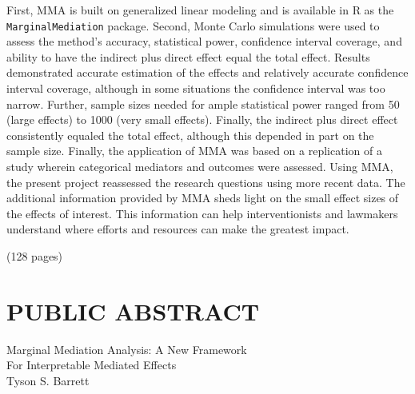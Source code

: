 \documentclass[]{DissertateUSU}
\begin{document}
First, MMA is built on generalized linear modeling and is available in R
as the \texttt{MarginalMediation} package. Second, Monte Carlo
simulations were used to assess the method's accuracy, statistical
power, confidence interval coverage, and ability to have the indirect
plus direct effect equal the total effect. Results demonstrated accurate
estimation of the effects and relatively accurate confidence interval
coverage, although in some situations the confidence interval was too
narrow. Further, sample sizes needed for ample statistical power ranged
from 50 (large effects) to 1000 (very small effects). Finally, the
indirect plus direct effect consistently equaled the total effect,
although this depended in part on the sample size. Finally, the
application of MMA was based on a replication of a study wherein
categorical mediators and outcomes were assessed. Using MMA, the present
project reassessed the research questions using more recent data. The
additional information provided by MMA sheds light on the small effect
sizes of the effects of interest. This information can help
interventionists and lawmakers understand where efforts and resources
can make the greatest impact.

\hspace{11 cm} (128 pages)

\singlespacing

\newpage

 \fancyhead[R]{\thepage} \fancyfoot[C]{}
\chapter*{PUBLIC ABSTRACT}

\doublespacing

\begin{center}
Marginal Mediation Analysis: A New Framework \\ 
For Interpretable Mediated Effects \\
Tyson S. Barrett
\end{center}

\vspace{12pt}
\end{document}
